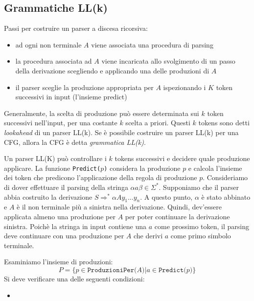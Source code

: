 \documentclass[11pt]{article}
\begin{document}
\subsection{Grammatiche LL(k)}
Passi per costruire un parser a discesa ricorsiva:
\begin{itemize}
    \item ad ogni non terminale $A$ viene associata una procedura di parsing
    \item la procedura associata ad $A$ viene incaricata allo svolgimento di un passo della derivazione scegliendo e applicando
    una delle produzioni di $A$
    \item il parser sceglie la produzione appropriata per $A$ ispezionando i $K$ token successivi in input (l'insieme 
    predict)
\end{itemize}
Generalmente, la scelta di produzione può essere determinata sui $k$ token successivi nell'input, per una costante $k$
scelta a priori. Questi $k$ tokens sono detti \textit{lookahead} di un parser LL(k). Se è possibile costruire un parser 
LL(k) per una CFG, allora la CFG è detta \textit{grammatica LL(k)}.

Un parser LL(K) può controllare i $k$ tokens successivi e decidere quale produzione applicare. La funzione \texttt{Predict($p$)}
considera la produzione $p$ e calcola l'insieme dei token che predicono l'applicazione della regola di produzione $p$.
Consideriamo di dover effettuare il parsing della stringa $\alpha a\beta\in\Sigma^*$. Supponiamo che il parser abbia 
costruito la derivazione $S\Rightarrow^*\alpha Ay_1\dots y_n$. A questo punto, $\alpha$ è stato abbinato e $A$ è il non 
terminale più a sinistra nella derivazione. Quindi, dev'essere applicata almeno una produzione per $A$ per poter continuare 
la derivazione sinistra. Poichè la stringa in input contiene una $a$ come prossimo token, il parsing deve continuare con 
una produzione per $A$ che derivi $a$ come primo simbolo terminale.

Esaminiamo l'insieme di produzioni:
\begin{equation*}
    P=\{p\in\texttt{ProduzioniPer($A$)}|a\in\texttt{Predict($p$)}\}
\end{equation*}
Si deve verificare una delle seguenti condizioni:
\begin{itemize}
    \item 
\end{itemize}
\end{document}
